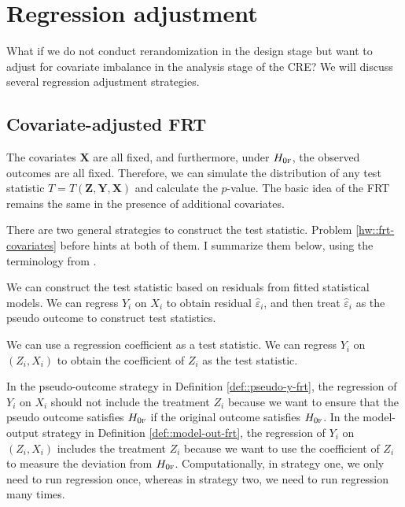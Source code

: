 \section{Regression adjustment}

What if we do not conduct rerandomization in the design stage but want to adjust for covariate imbalance in the analysis stage of the CRE? We will discuss several regression adjustment strategies. 

\subsection{Covariate-adjusted FRT}\label{sec::covariate-adjusted-frt-intro}


The covariates $\bm{X}$ are all fixed, and furthermore, under $H_{0\textsc{f}}$, the observed outcomes are all fixed. Therefore, we can simulate the distribution of any test statistic $T = T(\bm{Z}, \bm{Y}, \bm{X})$ and calculate the $p$-value. The basic idea of the FRT remains the same in the presence of additional covariates.  


There are two general strategies to construct the test statistic. Problem \ref{hw::frt-covariates} before hints at both of them. I summarize them below, using the terminology from \citet{zhao2020caFRT}. 


\begin{definition}
\label{def::pseudo-y-frt}
We can construct the test statistic based on residuals from fitted statistical models. We can regress $Y_i$ on $X_i$ to obtain residual $\hat \varepsilon_i$, and then treat $\hat \varepsilon_i$ as the pseudo outcome to construct test statistics.
\end{definition}



\begin{definition}
\label{def::model-out-frt}
We can use a regression coefficient as a test statistic. We can regress  $Y_i$ on $(Z_i, X_i)$ to obtain the coefficient of $Z_i$ as the test statistic.
\end{definition}

 

In the pseudo-outcome strategy in Definition \ref{def::pseudo-y-frt}, the regression of $Y_i$ on $X_i$ should not include the treatment $Z_i$ because we want to ensure that the pseudo outcome satisfies $H_{0\textsc{f}}$ if the original outcome satisfies $H_{0\textsc{f}}$. 
In the model-output strategy in Definition \ref{def::model-out-frt}, the regression of $Y_i$ on $(Z_i, X_i)$ includes the treatment $Z_i$ because we want to use the coefficient of $Z_i$ to measure the deviation from $H_{0\textsc{f}}$.  
Computationally, in strategy one, we only need to run regression once, whereas in strategy two, we need to run regression many times. 

